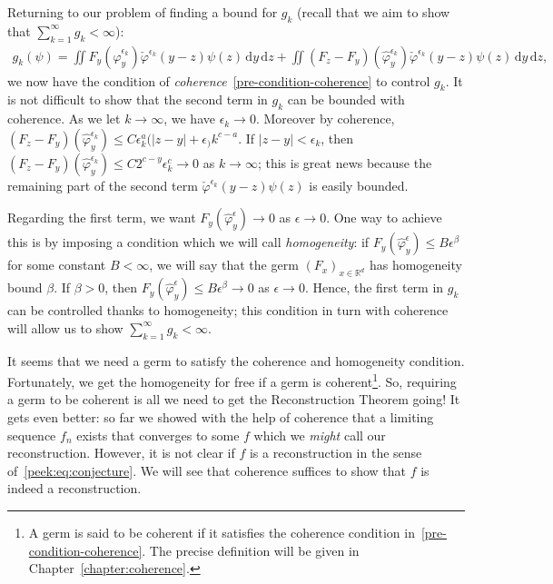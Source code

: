 Returning to our problem of finding a bound for \(g_k\) (recall that we aim to show that \(\sum^\infty_{k=1} g_k < \infty\)):
\begin{align*}
    g_k(\psi) = \iint F_y(\hat \varphi^{\epsilon_k}_y) \check \varphi^{\epsilon_k}(y-z) \psi(z) \, \mathrm{d}y\, \mathrm{d}z 
    + \iint (F_z - F_y)(\hat \varphi^{\epsilon_k}_y) \check \varphi^{\epsilon_k}(y-z) \psi(z) \, \mathrm{d}y\, \mathrm{d}z,
\end{align*}
we now have the condition of \emph{coherence}~\eqref{pre-condition-coherence} to control \(g_k\). It is not difficult to show that the second term in \(g_k\) can be bounded with coherence. As we let \(k \to \infty\), we have \(\epsilon_k \to 0\). Moreover by coherence, \((F_z - F_y)(\hat \varphi^{\epsilon_k}_y) \leq C \epsilon_k^{a} {(|z-y| + \epsilon_)}k^{c-a}\). If \(|z-y| < \epsilon_k\), then \((F_z - F_y)(\hat \varphi^{\epsilon_k}_y) \leq C2^{c-y} \epsilon_k^c \to 0\) as \(k \to \infty\); this is great news because the remaining part of the second term \(\check \varphi^{\epsilon_k}(y-z) \psi(z)\) is easily bounded.

Regarding the first term, we want \(F_y(\hat \varphi^{\epsilon}_y) \to 0\) as \(\epsilon \to 0\). One way to achieve this is by imposing a condition which we will call \emph{homogeneity}: if \(F_y(\hat \varphi^{\epsilon}_y) \leq B \epsilon^{\beta}\) for some constant \(B < \infty\), we will say that the germ \({(F_x)}_{x \in \mathbb{R}^d}\) has homogeneity bound \(\beta\). If \(\beta > 0\), then   \(F_y(\hat \varphi^{\epsilon}_y) \leq B \epsilon^\beta \to 0\) as \(\epsilon \to 0\). Hence, the first term in \(g_k\) can be controlled thanks to homogeneity; this condition in turn with coherence will allow us to show \(\sum^\infty_{k=1} g_k < \infty\). 

It seems that we need a germ to satisfy the coherence and homogeneity condition. Fortunately, we get the homogeneity for free if a germ is coherent\footnote{A germ is said to be coherent if it satisfies the coherence condition in~\eqref{pre-condition-coherence}. The precise definition will be given in Chapter~\ref{chapter:coherence}.}. So, requiring a germ to be coherent is all we need to get the Reconstruction Theorem going! It gets even better: so far we showed with the help of coherence that a limiting sequence \(f_n\) exists that converges to some \(f\) which we \emph{might} call our reconstruction. However, it is not clear if \(f\) is a reconstruction in the sense of~\eqref{peek:eq:conjecture}. We will see that coherence suffices to show that \(f\) is indeed a reconstruction.

